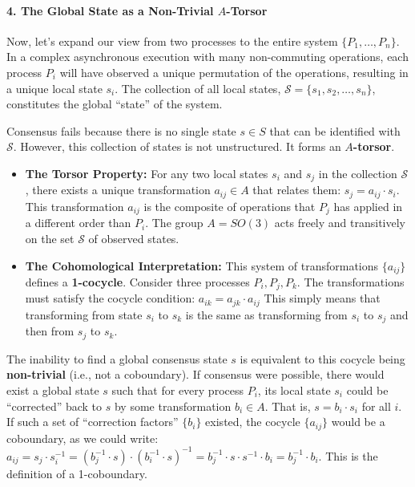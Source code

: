 \documentclass[
]{article}
\begin{document}
\paragraph{\texorpdfstring{4. The Global State as a Non-Trivial
\(A\)-Torsor}{4. The Global State as a Non-Trivial A-Torsor}}\label{the-global-state-as-a-non-trivial-a-torsor}

Now, let's expand our view from two processes to the entire system
\(\{P_1, \dots, P_n\}\). In a complex asynchronous execution with many
non-commuting operations, each process \(P_i\) will have observed a
unique permutation of the operations, resulting in a unique local state
\(s_i\). The collection of all local states,
\(\mathcal{S} = \{s_1, s_2, \dots, s_n\}\), constitutes the global
``state'' of the system.

Consensus fails because there is no single state \(s \in S\) that can be
identified with \(\mathcal{S}\). However, this collection of states is
not unstructured. It forms an \textbf{\(A\)-torsor}.

\begin{itemize}
\item
  \textbf{The Torsor Property:} For any two local states \(s_i\) and
  \(s_j\) in the collection \(\mathcal{S}\), there exists a unique
  transformation \(a_{ij} \in A\) that relates them:
  \(s_j = a_{ij} \cdot s_i\). This transformation \(a_{ij}\) is the
  composite of operations that \(P_j\) has applied in a different order
  than \(P_i\). The group \(A=SO(3)\) acts freely and transitively on
  the set \(\mathcal{S}\) of observed states.
\item
  \textbf{The Cohomological Interpretation:} This system of
  transformations \(\{a_{ij}\}\) defines a \textbf{1-cocycle}. Consider
  three processes \(P_i, P_j, P_k\). The transformations must satisfy
  the cocycle condition: \(a_{ik} = a_{jk} \cdot a_{ij}\) This simply
  means that transforming from state \(s_i\) to \(s_k\) is the same as
  transforming from \(s_i\) to \(s_j\) and then from \(s_j\) to \(s_k\).
\end{itemize}

The inability to find a global consensus state \(s\) is equivalent to
this cocycle being \textbf{non-trivial} (i.e., not a coboundary). If
consensus were possible, there would exist a global state \(s\) such
that for every process \(P_i\), its local state \(s_i\) could be
``corrected'' back to \(s\) by some transformation \(b_i \in A\). That
is, \(s = b_i \cdot s_i\) for all \(i\). If such a set of ``correction
factors'' \(\{b_i\}\) existed, the cocycle \(\{a_{ij}\}\) would be a
coboundary, as we could write:
\(a_{ij} = s_j \cdot s_i^{-1} = (b_j^{-1} \cdot s) \cdot (b_i^{-1} \cdot s)^{-1} = b_j^{-1} \cdot s \cdot s^{-1} \cdot b_i = b_j^{-1} \cdot b_i\).
This is the definition of a 1-coboundary.
\end{document}
